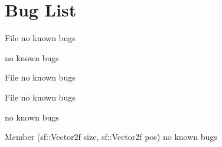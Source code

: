\chapter{Bug List}
\hypertarget{bug}{}\label{bug}

\begin{DoxyRefList}
\item[File \doxylink{_animate_8cpp}{Animate.cpp} ]\label{bug__bug000001}%
%
no known bugs 

\label{bug__bug000002}%
%
no known bugs  
\item[File \doxylink{_coin_8cpp}{Coin.cpp} ]\label{bug__bug000003}%
%
no known bugs  
\item[File \doxylink{_coin_8h}{Coin.h} ]\label{bug__bug000005}%
%
no known bugs 

\label{bug__bug000024}%
%
no known bugs  
\item[Member \doxylink{class_coin_a35be9e6e0ef63b74def69e7b7794fd08}{Coin\+::Coin} (sf\+::\+Vector2f size, sf\+::\+Vector2f pos)]\label{bug__bug000004}%
%
no known bugs 


\end{DoxyRefList}
